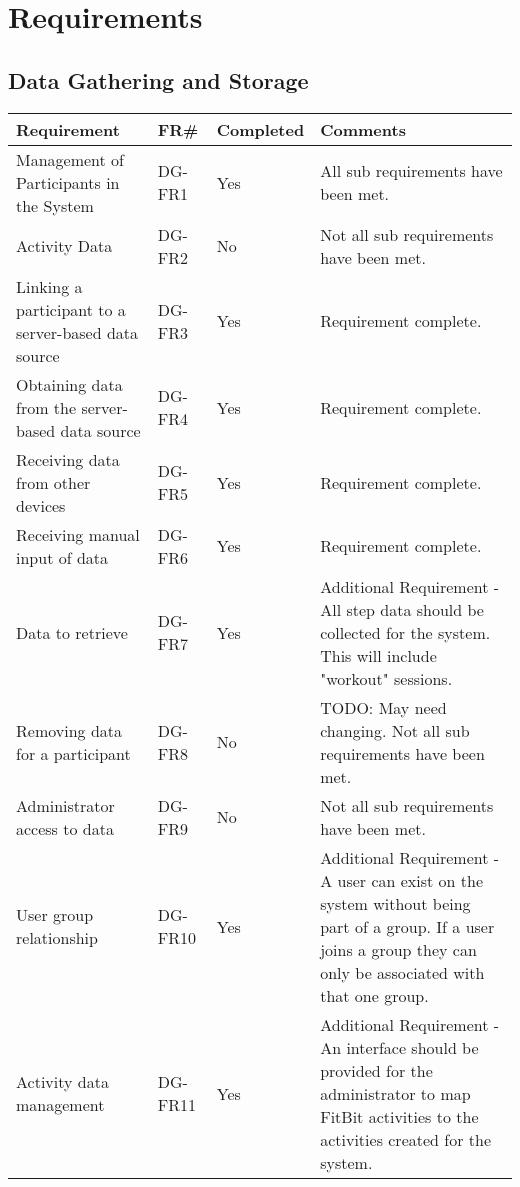 \chapter{Requirements}

\section{Data Gathering and Storage}
\begin{tabular}{ |p{5cm}|l|l|p{8cm}|}
\hline
\textbf{Requirement}	&	\textbf{FR\#}	&	\textbf{Completed}	&	\textbf{Comments} \\
\hline
Management of Participants in the System			& DG-FR1	& Yes	& All sub requirements have been met. \\
\hline
Activity Data										& DG-FR2	& No	& Not all sub requirements have been met. \\
\hline
Linking a participant to a server-based data source	& DG-FR3	& Yes	& Requirement complete. \\
\hline
Obtaining data from the server-based data source	& DG-FR4	& Yes	& Requirement complete. \\
\hline
Receiving data from other devices					& DG-FR5	& Yes	& Requirement complete. \\
\hline
Receiving manual input of data						& DG-FR6	& Yes	& Requirement complete. \\
\hline
Data to retrieve 									& DG-FR7	& Yes	& Additional Requirement - All step data should be collected for the system. This will include "workout" sessions. \\
\hline
Removing data for a participant						& DG-FR8	& No	& TODO: May need changing. Not all sub requirements have been met. \\
\hline
Administrator access to data						& DG-FR9	& No	& Not all sub requirements have been met. \\
\hline
User group relationship								& DG-FR10	& Yes	& Additional Requirement - A user can exist on the system without being part of  a group. If a user joins a group they can only be associated with that one group. \\
\hline
Activity data management							& DG-FR11	& Yes	& Additional Requirement - An interface should be provided for the administrator to map FitBit activities to the activities created for the system. \\
\hline
\end{tabular}

